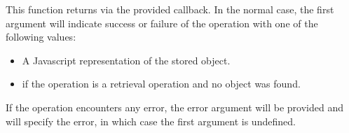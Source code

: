 This function returns via the provided callback.  In the normal case, the first
argument will indicate success or failure of the operation with one of the
following values:

\begin{itemize}[noitemsep]
\item A Javascript representation of the stored object.
\item {} if the operation is a retrieval operation and no object was
    found.
\end{itemize}

If the operation encounters any error, the error argument will be provided and
will specify the error, in which case the first argument is undefined.

